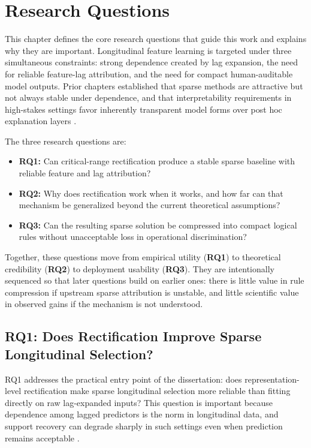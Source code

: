
\chapter{Research Questions}

This chapter defines the core research questions that guide this work and explains why they are important. Longitudinal feature learning is targeted under three simultaneous constraints: strong dependence created by lag expansion, the need for reliable feature-lag attribution, and the need for compact human-auditable model outputs. Prior chapters established that sparse methods are attractive but not always stable under dependence, and that interpretability requirements in high-stakes settings favor inherently transparent model forms over post hoc explanation layers \autocites{tibshirani1996,PZhao2006model,freijeirogonzalez2022,CRudin2019Stop,WJMurdoch2019Definitions}.

The three research questions are:
\begin{itemize}
    \item \textbf{RQ1:} Can critical-range rectification produce a stable sparse baseline with reliable feature and lag attribution?
    \item \textbf{RQ2:} Why does rectification work when it works, and how far can that mechanism be generalized beyond the current theoretical assumptions?
    \item \textbf{RQ3:} Can the resulting sparse solution be compressed into compact logical rules without unacceptable loss in operational discrimination?
\end{itemize}

Together, these questions move from empirical utility (\textbf{RQ1}) to theoretical credibility (\textbf{RQ2}) to deployment usability (\textbf{RQ3}). They are intentionally sequenced so that later questions build on earlier ones: there is little value in rule compression if upstream sparse attribution is unstable, and little scientific value in observed gains if the mechanism is not understood.

\section{RQ1: Does Rectification Improve Sparse Longitudinal Selection?}

RQ1 addresses the practical entry point of the dissertation: does representation-level rectification make sparse longitudinal selection more reliable than fitting directly on raw lag-expanded inputs? This question is important because dependence among lagged predictors is the norm in longitudinal data, and support recovery can degrade sharply in such settings even when prediction remains acceptable \autocites{PZhao2006model,freijeirogonzalez2022}.

